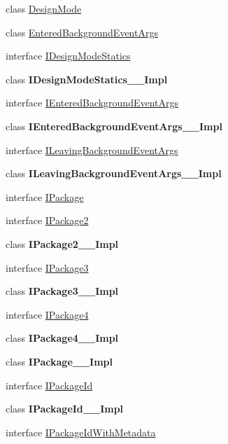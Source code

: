 \begin{DoxyCompactItemize}
\item 
class \hyperlink{class_windows_1_1_application_model_1_1_design_mode}{Design\+Mode}
\item 
class \hyperlink{class_windows_1_1_application_model_1_1_entered_background_event_args}{Entered\+Background\+Event\+Args}
\item 
interface \hyperlink{interface_windows_1_1_application_model_1_1_i_design_mode_statics}{I\+Design\+Mode\+Statics}
\item 
class {\bfseries I\+Design\+Mode\+Statics\+\_\+\+\_\+\+Impl}
\item 
interface \hyperlink{interface_windows_1_1_application_model_1_1_i_entered_background_event_args}{I\+Entered\+Background\+Event\+Args}
\item 
class {\bfseries I\+Entered\+Background\+Event\+Args\+\_\+\+\_\+\+Impl}
\item 
interface \hyperlink{interface_windows_1_1_application_model_1_1_i_leaving_background_event_args}{I\+Leaving\+Background\+Event\+Args}
\item 
class {\bfseries I\+Leaving\+Background\+Event\+Args\+\_\+\+\_\+\+Impl}
\item 
interface \hyperlink{interface_windows_1_1_application_model_1_1_i_package}{I\+Package}
\item 
interface \hyperlink{interface_windows_1_1_application_model_1_1_i_package2}{I\+Package2}
\item 
class {\bfseries I\+Package2\+\_\+\+\_\+\+Impl}
\item 
interface \hyperlink{interface_windows_1_1_application_model_1_1_i_package3}{I\+Package3}
\item 
class {\bfseries I\+Package3\+\_\+\+\_\+\+Impl}
\item 
interface \hyperlink{interface_windows_1_1_application_model_1_1_i_package4}{I\+Package4}
\item 
class {\bfseries I\+Package4\+\_\+\+\_\+\+Impl}
\item 
class {\bfseries I\+Package\+\_\+\+\_\+\+Impl}
\item 
interface \hyperlink{interface_windows_1_1_application_model_1_1_i_package_id}{I\+Package\+Id}
\item 
class {\bfseries I\+Package\+Id\+\_\+\+\_\+\+Impl}
\item 
interface \hyperlink{interface_windows_1_1_application_model_1_1_i_package_id_with_metadata}{I\+Package\+Id\+With\+Metadata}
\item 

\end{DoxyCompactItemize}
